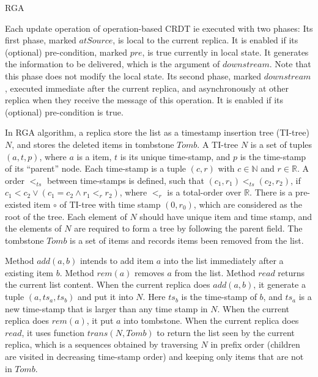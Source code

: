 {\begin{algorithm}[H]
\caption{RGA}
\label{Method1}
\end{algorithm}

Each update operation of operation-based CRDT ie executed with two phases: Its first phase, marked $\mathit{atSource}$, is local to the current replica. It is enabled if its (optional) pre-condition, marked $\mathit{pre}$, is true currently in local state. It generates the information to be delivered, which is the argument of $\mathit{downstream}$. Note that this phase does not modify the local state. Its second phase, marked $\mathit{downstream}$, executed immediate after the current replica, and asynchronously at other replica when they receive the message of this operation. It is enabled if its (optional) pre-condition is true.

In RGA algorithm, a replica store the list as a timestamp insertion tree (TI-tree) $N$, and stores the deleted items in tombstone $\mathit{Tomb}$. A TI-tree $N$ is a set of tuples $(a,t,p)$, where $a$ is a item, $t$ is its unique time-stamp, and $p$ is the time-stamp of its ``parent'' node. Each time-stamp is a tuple $(c,r)$ with $c \in \mathbb{N}$ and $r \in \mathbb{R}$. A order $<_{\mathit{ts}}$ between time-stamps is defined, such that $(c_1,r_1) <_{\mathit{ts}} (c_2,r_2)$, if $c_1 < c_2 \vee (c_1 = c_2 \wedge r_1 <_r r_2)$, where $<_r$ is a total-order over $\mathbb{R}$. There is a pre-existed item $\circ$ of TI-tree with time stamp $(0,r_0)$, which are considered as the root of the tree. Each element of $N$ should have unique item and time stamp, and the elements of $N$ are required to form a tree by following the parent field. The tombstone $\mathit{Tomb}$ is a set of items and records items been removed from the list.

Method $\mathit{add}(a,b)$ intends to add item $a$ into the list immediately after a existing item $b$. Method $\mathit{rem}(a)$ removes $a$ from the list. Method $\mathit{read}$ returns the current list content. When the current replica does $\mathit{add}(a,b)$, it generate a tuple $(a,ts_a,ts_b)$ and put it into $N$. Here $ts_b$ is the time-stamp of $b$, and $ts_a$ is a new time-stamp that is larger than any time stamp in $N$. When the current replica does $\mathit{rem}(a)$, it put $a$ into tombstone. When the current replica does $\mathit{read}$, it uses function $\mathit{trans}(N,\mathit{Tomb})$ to return the list seen by the current replica, which is a sequences obtained by traversing $N$ in prefix order (children are visited in decreasing time-stamp order) and keeping only items that are not in $\mathit{Tomb}$.


}
